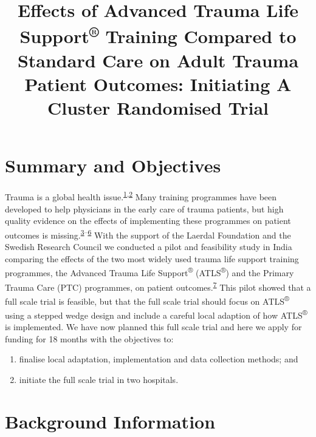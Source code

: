\documentclass[
  11pt,
]{article}
\title{Effects of Advanced Trauma Life Support\textsuperscript{®} Training Compared to Standard Care on Adult Trauma Patient Outcomes: Initiating A Cluster Randomised Trial}
\author{}
\date{\vspace{-2.5em}}
\providecommand{\tightlist}{%
  \setlength{\itemsep}{0pt}\setlength{\parskip}{0pt}}
\begin{document}
\maketitle

\pagestyle{fancy}

\hypertarget{summary-and-objectives}{%
\section{Summary and Objectives}\label{summary-and-objectives}}

Trauma is a global health issue.\textsuperscript{\protect\hyperlink{ref-injuries2020}{1},\protect\hyperlink{ref-GBD2020}{2}} Many training programmes have been developed to help physicians in the early care of trauma patients, but high quality evidence on the effects of implementing these programmes on patient outcomes is missing.\textsuperscript{\protect\hyperlink{ref-Mohammad2013}{3}--\protect\hyperlink{ref-Jin2021}{6}} With the support of the Laerdal Foundation and the Swedish Research Council we conducted a pilot and feasibility study in India comparing the effects of the two most widely used trauma life support training programmes, the Advanced Trauma Life Support\textsuperscript{®} (ATLS\textsuperscript{®}) and the Primary Trauma Care (PTC) programmes, on patient outcomes.\textsuperscript{\protect\hyperlink{ref-GerdinWuxe4rnberg2022}{7}} This pilot showed that a full scale trial is feasible, but that the full scale trial should focus on ATLS\textsuperscript{®} using a stepped wedge design and include a careful local adaption of how ATLS\textsuperscript{®} is implemented. We have now planned this full scale trial and here we apply for funding for 18 months with the objectives to:

\begin{enumerate}
\def\labelenumi{\arabic{enumi}.}
\tightlist
\item
  finalise local adaptation, implementation and data collection methods; and
\item
  initiate the full scale trial in two hospitals.
\end{enumerate}

\hypertarget{background-information}{%
\section{Background Information}\label{background-information}}
\end{document}
